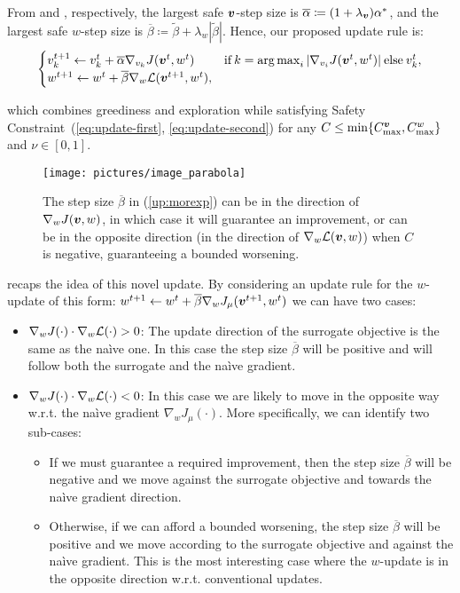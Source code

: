 From  and , respectively, the largest safe $\vv$-step size is $\overline{\alpha}\coloneqq(1+\lambda_{\vv})\alpha^*$, and the largest safe $w$-step size is $\overline{\beta}\coloneqq\tilde{\beta} + \lambda_{w}|\tilde{\beta}|$. Hence, our proposed update rule is:
%
\begin{align}\label{up:morexp}
\begin{cases}
v_{k}^{t+1} \gets v_{k}^t + \overline{\alpha}\gradJ[v_{k}]{\vv^t,w^t}
& \text{if}\:k =  \argmax_i |\gradJ[v_i]{\vv^t, w^t}| \:\text{else}\:v_{k}^t,\\
w^{t+1} \gets w^t + \overline{\beta}\gradDelta(\vv^{t+1}, w^t),
\end{cases}
\end{align}

which combines greediness and exploration while satisfying Safety Constraint~(\ref{eq:update-first}, \ref{eq:update-second}) for any ${C\leq\min\{C_{\text{max}}^{\vv},C_{\text{max}}^{w}\}}$ and $\nu\in[0,1]$. 

\begin{figure}
\texttt{[image: pictures/image\_parabola]}
\caption{The step size $\overline{\beta}$ in (\ref{up:morexp}) can be in the direction of $\gradJ[w]{\vv, w}$, in which case it will guarantee an improvement, or can be in the opposite direction (in the direction of $\gradDelta(\vv, w)$) when $C$ is negative, guaranteeing a bounded worsening. }
\label{fig:boobs}
\end{figure}

 recaps the idea of this novel update. By considering an update rule for the $w$-update of this form: $w^{t+1} \gets w^t + \overline{\beta} \nabla_w J_\mu(\vv^{t+1}, w^t)$ we can have two cases:
\begin{itemize}
\item $\nabla_w J(\cdot) \cdot \nabla_w \Deltav(\cdot) > 0$: The update direction of the surrogate objective is the same as the na\`ive one. In this case the step size $\overline{\beta}$ will be positive and will follow both the surrogate and the na\`ive gradient.
\item $\nabla_w J(\cdot) \cdot \nabla_w \Deltav(\cdot) < 0$: In this case we are likely to move in the opposite way w.r.t. the na\`ive gradient $\nabla_w J_\mu(\cdot)$. More specifically, we can identify two sub-cases:
\begin{itemize}
\item If we must guarantee a required improvement, then the step size $\overline{\beta}$ will be negative and we move against the surrogate objective and towards the na\`ive gradient direction.
\item Otherwise, if we can afford a bounded worsening, the step size $\overline{\beta}$ will be positive and we move according to the surrogate objective and against the na\`ive gradient. This is the most interesting case where the $w$-update is in the opposite direction w.r.t. conventional updates.
\end{itemize}
\end{itemize}

